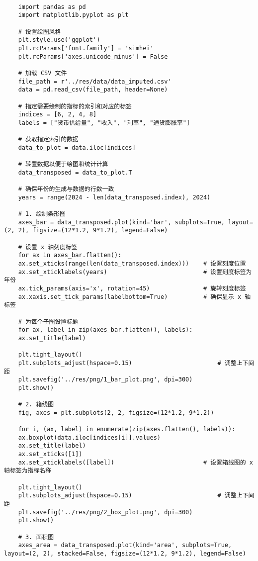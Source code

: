 \begin{lstlisting}[caption={问题一处理代码}]
	
	import pandas as pd
	import matplotlib.pyplot as plt
	
	# 设置绘图风格
	plt.style.use('ggplot')
	plt.rcParams['font.family'] = 'simhei'
	plt.rcParams['axes.unicode_minus'] = False
	
	# 加载 CSV 文件
	file_path = r'../res/data/data_imputed.csv'
	data = pd.read_csv(file_path, header=None)
	
	# 指定需要绘制的指标的索引和对应的标签
	indices = [6, 2, 4, 8]
	labels = ["货币供给量", "收入", "利率", "通货膨胀率"]
	
	# 获取指定索引的数据
	data_to_plot = data.iloc[indices]
	
	# 转置数据以便于绘图和统计计算
	data_transposed = data_to_plot.T
	
	# 确保年份的生成与数据的行数一致
	years = range(2024 - len(data_transposed.index), 2024)
	
	# 1. 绘制条形图
	axes_bar = data_transposed.plot(kind='bar', subplots=True, layout=(2, 2), figsize=(12*1.2, 9*1.2), legend=False)
	
	# 设置 x 轴刻度标签
	for ax in axes_bar.flatten():
	ax.set_xticks(range(len(data_transposed.index)))    # 设置刻度位置
	ax.set_xticklabels(years)                           # 设置刻度标签为年份
	ax.tick_params(axis='x', rotation=45)               # 旋转刻度标签
	ax.xaxis.set_tick_params(labelbottom=True)          # 确保显示 x 轴标签
	
	# 为每个子图设置标题
	for ax, label in zip(axes_bar.flatten(), labels):
	ax.set_title(label)
	
	plt.tight_layout()
	plt.subplots_adjust(hspace=0.15)                        # 调整上下间距
	plt.savefig('../res/png/1_bar_plot.png', dpi=300)
	plt.show()
	
	# 2. 箱线图
	fig, axes = plt.subplots(2, 2, figsize=(12*1.2, 9*1.2))
	
	for i, (ax, label) in enumerate(zip(axes.flatten(), labels)):
	ax.boxplot(data.iloc[indices[i]].values)
	ax.set_title(label)
	ax.set_xticks([1])
	ax.set_xticklabels([label])                         # 设置箱线图的 x 轴标签为指标名称
	
	plt.tight_layout()
	plt.subplots_adjust(hspace=0.15)                        # 调整上下间距
	plt.savefig('../res/png/2_box_plot.png', dpi=300)
	plt.show()
	
	# 3. 面积图
	axes_area = data_transposed.plot(kind='area', subplots=True, layout=(2, 2), stacked=False, figsize=(12*1.2, 9*1.2), legend=False)
	

\end{lstlisting}
